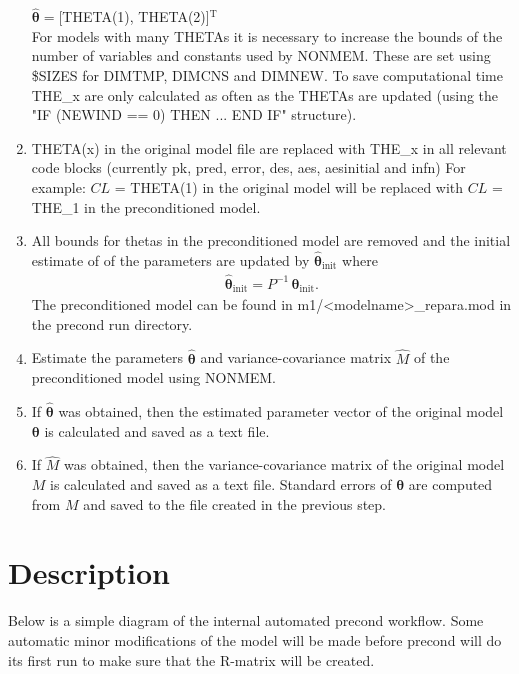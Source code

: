 \begin{enumerate}
        \indent $\hat{\boldsymbol{\theta}}=$[THETA(1), THETA(2)]$^\textrm{T}$\\
        For models with many THETAs it is necessary to increase the bounds of the number of variables and constants used by NONMEM. These are set using \$SIZES for DIMTMP, DIMCNS and DIMNEW. To save computational time THE\_x are only calculated as often as the THETAs are updated (using the "IF (NEWIND == 0) THEN ... END IF" structure).
    \item THETA(x) in the original model file are replaced with THE\_x in all relevant code blocks (currently pk, pred, error, des, aes, aesinitial and infn)
        For example: $CL$ = THETA(1) in the original model will be replaced with $CL$ = THE\_1 in the preconditioned model.

	\item All bounds for thetas in the preconditioned model are removed and the initial estimate of of the parameters are updated by $\hat{\boldsymbol{\theta}}_\textrm{init}$ where
	\begin{eqnarray*}
	    \hat{\boldsymbol{\theta}}_\textrm{init}= P^{-1} \,{\boldsymbol{\theta}}_\textrm{init}.
	\end{eqnarray*}
	The preconditioned model can be found in m1/<modelname>\_repara.mod in the precond run directory.
	\item Estimate the parameters $\hat{\boldsymbol{\theta}}$ and variance-covariance matrix $\hat{M}$ of the preconditioned model using NONMEM.
	\item If $\hat{\boldsymbol{\theta}}$ was obtained, then the estimated parameter vector of the original model $\boldsymbol{\theta}$ is calculated and saved as a text file.
	\item If $\hat{M}$ was obtained, then the variance-covariance matrix of the original model $M$ is calculated and saved as a text file. Standard errors of $\boldsymbol{\theta}$ are computed from $M$ and saved to the file created in the previous step.
\end{enumerate}



\section{Description}

Below is a simple diagram of the internal automated precond workflow. Some automatic minor modifications of the model will be made before precond will do its first run to make sure that the R-matrix will be created.

